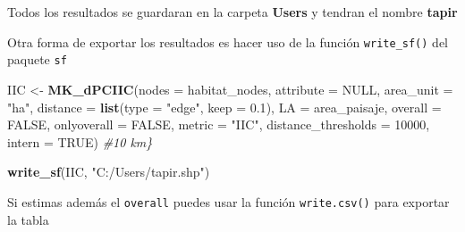 \documentclass[
]{book}
\newenvironment{Shaded}{\begin{snugshade}}{\end{snugshade}}
\newcommand{\AttributeTok}[1]{\textcolor[rgb]{0.13,0.29,0.53}{#1}}
\newcommand{\CommentTok}[1]{\textcolor[rgb]{0.56,0.35,0.01}{\textit{#1}}}
\newcommand{\ConstantTok}[1]{\textcolor[rgb]{0.56,0.35,0.01}{#1}}
\newcommand{\DecValTok}[1]{\textcolor[rgb]{0.00,0.00,0.81}{#1}}
\newcommand{\FloatTok}[1]{\textcolor[rgb]{0.00,0.00,0.81}{#1}}
\newcommand{\FunctionTok}[1]{\textcolor[rgb]{0.13,0.29,0.53}{\textbf{#1}}}
\newcommand{\NormalTok}[1]{#1}
\newcommand{\OtherTok}[1]{\textcolor[rgb]{0.56,0.35,0.01}{#1}}
\newcommand{\SpecialCharTok}[1]{\textcolor[rgb]{0.81,0.36,0.00}{\textbf{#1}}}
\newcommand{\StringTok}[1]{\textcolor[rgb]{0.31,0.60,0.02}{#1}}
\begin{document}
Todos los resultados se guardaran en la carpeta \textbf{Users} y tendran el nombre \textbf{tapir}

Otra forma de exportar los resultados es hacer uso de la función \texttt{write\_sf()} del paquete \texttt{sf}

\begin{Shaded}
\begin{Highlighting}[]
\NormalTok{IIC }\OtherTok{\textless{}{-}} \FunctionTok{MK\_dPCIIC}\NormalTok{(}\AttributeTok{nodes =}\NormalTok{ habitat\_nodes,}
                 \AttributeTok{attribute =} \ConstantTok{NULL}\NormalTok{,}
                 \AttributeTok{area\_unit =} \StringTok{"ha"}\NormalTok{,  }
                 \AttributeTok{distance =} \FunctionTok{list}\NormalTok{(}\AttributeTok{type =} \StringTok{"edge"}\NormalTok{, }\AttributeTok{keep =} \FloatTok{0.1}\NormalTok{),}
                 \AttributeTok{LA =}\NormalTok{ area\_paisaje, }
                 \AttributeTok{overall =} \ConstantTok{FALSE}\NormalTok{,  }
                 \AttributeTok{onlyoverall =} \ConstantTok{FALSE}\NormalTok{,}
                 \AttributeTok{metric =} \StringTok{"IIC"}\NormalTok{,}
                 \AttributeTok{distance\_thresholds =} \DecValTok{10000}\NormalTok{,}
                 \AttributeTok{intern =} \ConstantTok{TRUE}\NormalTok{) }\CommentTok{\#10 km\}}

\FunctionTok{write\_sf}\NormalTok{(IIC, }\StringTok{"C:/Users/tapir.shp"}\NormalTok{)}
\end{Highlighting}
\end{Shaded}

Si estimas además el \texttt{overall} puedes usar la función \texttt{write.csv()} para exportar la tabla

\begin{Shaded}
\end{Shaded}
\end{document}
